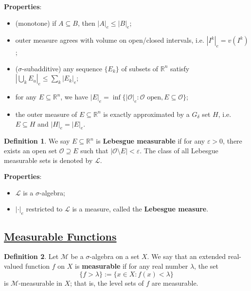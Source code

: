 \documentclass[11pt]{amsart}
\theoremstyle{definition}
\newtheorem*{definition*}{Definition}
\renewcommand\leq{\leqslant}
\renewcommand\:{\colon}
\newcommand{\calL}{\mathcal{L}}
\newcommand{\calM}{\mathcal{M}}
\newcommand{\calO}{\mathcal{O}}
\newcommand{\R}{\mathds{R}}
\begin{document}
\noindent \textbf{Properties}:
\begin{itemize}[leftmargin=15pt]\setlength\itemsep{0em}
	\item (monotone) if $A \subseteq B$, then $|A|_e \leq |B|_e$;
	\item outer measure agrees with volume on open/closed intervals, i.e. $|I^k|_e = v(I^k)$;
	\item ($\sigma$-subadditive) any sequence $\{E_k\}$ of subsets of $\R^n$ satisfy $|\bigcup_k E_u|_e \leq \sum_k |E_k|_e$;
	\item for any $E \subseteq \R^n$, we have $|E|_e = \inf\{ |\calO|_e : \calO \text{ open}, E \subseteq \calO\}$;
	\item the outer measure of $E \subseteq \R^n$ is exactly approximated by a $G_\delta$ set $H$, i.e. $E \subseteq H$ and $|H|_e = |E|_e$.
\end{itemize}

\begin{definition*}
	We say $E \subseteq \R^n$ is \textbf{Lebesgue measurable} if for any $\varepsilon > 0$, there exists an open set $\calO \supseteq E$ such that $|\calO \setminus E| < \varepsilon$. The class of all Lebesgue measurable sets is denoted by $\calL$.
\end{definition*}

\noindent \textbf{Properties}:
\begin{itemize}[leftmargin=15pt]\setlength\itemsep{0em}
	\item $\calL$ is a $\sigma$-algebra;
	\item $|\cdot|_e$ restricted to $\calL$ is a measure, called the \textbf{Lebesgue measure}.
\end{itemize}



\subsection*{\underline{Measurable Functions}}

\begin{definition*}
	Let $\calM$ be a $\sigma$-algebra on a set $X$. We say that an extended real-valued function $f$ on $X$ is \textbf{measurable} if for any real number $\lambda$, the set
		\[ \{ f > \lambda \} := \{x \in X : f(x) < \lambda\} \]
	is $\calM$-measurable in $X$; that is, the level sets of $f$ are measurable.
\end{definition*}
\end{document}
